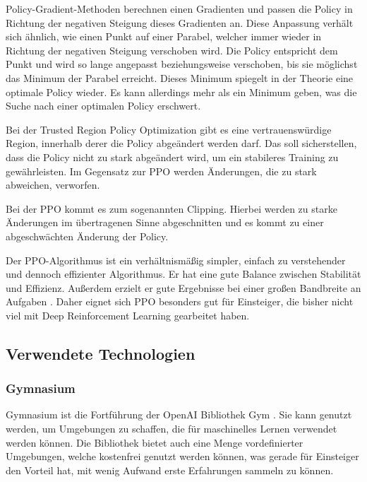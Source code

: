 Policy-Gradient-Methoden berechnen einen Gradienten und passen die Policy in Richtung der negativen Steigung dieses Gradienten an. Diese Anpassung verhält sich ähnlich, wie einen Punkt auf einer Parabel, welcher immer wieder in Richtung der negativen Steigung verschoben wird. Die Policy entspricht dem Punkt und wird so lange angepasst beziehungsweise verschoben, bis sie möglichst das Minimum der Parabel erreicht. Dieses Minimum spiegelt in der Theorie eine optimale Policy wieder. Es kann allerdings mehr als ein Minimum geben, was die Suche nach einer optimalen Policy erschwert.

Bei der Trusted Region Policy Optimization gibt es eine vertrauenswürdige Region, innerhalb derer die Policy abgeändert werden darf. Das soll sicherstellen, dass die Policy nicht zu stark abgeändert wird, um ein stabileres Training zu gewährleisten. Im Gegensatz zur PPO werden Änderungen, die zu stark abweichen, verworfen.

Bei der PPO kommt es zum sogenannten Clipping. Hierbei werden zu starke Änderungen im übertragenen Sinne abgeschnitten und es kommt zu einer abgeschwächten Änderung der Policy.

Der PPO-Algorithmus ist ein verhältnismäßig simpler, einfach zu verstehender und dennoch effizienter Algorithmus. Er hat eine gute Balance zwischen Stabilität und Effizienz. Außerdem erzielt er gute Ergebnisse bei einer großen Bandbreite an Aufgaben \cite{schulman_proximal_2017}. Daher eignet sich PPO besonders gut für Einsteiger, die bisher nicht viel mit Deep Reinforcement Learning gearbeitet haben.
\subsection{Verwendete Technologien}
\subsubsection{Gymnasium}
Gymnasium ist die Fortführung der OpenAI Bibliothek Gym \cite{towers_gymnasium_2023}. Sie kann genutzt werden, um Umgebungen zu schaffen, die für maschinelles Lernen verwendet werden können. Die Bibliothek bietet auch eine Menge vordefinierter Umgebungen, welche kostenfrei genutzt werden können, was gerade für Einsteiger den Vorteil hat, mit wenig Aufwand erste Erfahrungen sammeln zu können.

